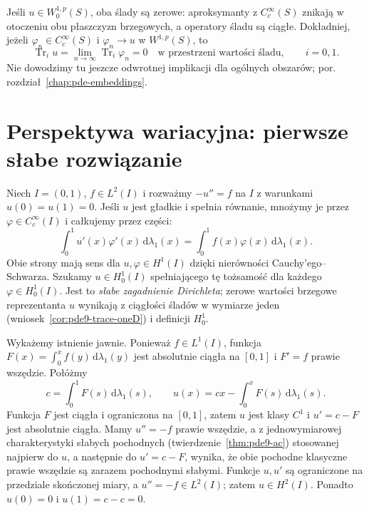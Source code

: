 Jeśli $u\in W^{1,p}_0(S)$, oba ślady są zerowe:
aproksymanty z $C_c^\infty(S)$ znikają w otoczeniu
obu płaszczyzn brzegowych, a operatory śladu są
ciągłe. Dokładniej, jeżeli $\varphi_n\in C_c^\infty(S)$
i $\varphi_n\to u$ w $W^{1,p}(S)$, to
\[
 \operatorname{Tr}_i u
 =\lim_{n\to\infty}\operatorname{Tr}_i\varphi_n=0
 \quad\text{w przestrzeni wartości śladu},\qquad i=0,1.
\]
Nie dowodzimy tu jeszcze odwrotnej implikacji
dla ogólnych obszarów; por. rozdział~\ref{chap:pde-embeddings}.

\section{Perspektywa wariacyjna: pierwsze słabe rozwiązanie}
\label{sec:pde9-weakPDE}

\begin{przyklad}
\label{ex:pde9-dirichlet}
Niech $I=(0,1)$, $f\in L^2(I)$ i rozważmy
$-u''=f$ na $I$ z warunkami $u(0)=u(1)=0$.
Jeśli $u$ jest gładkie i spełnia równanie, mnożymy je
przez $\varphi\in C_c^\infty(I)$ i całkujemy przez części:
\[
 \int_0^1u'(x)\varphi'(x)\,\mathrm d\lambda_1(x)
 =\int_0^1 f(x)\varphi(x)\,\mathrm d\lambda_1(x).
\]
Obie strony mają sens dla $u,\varphi\in H^1(I)$
dzięki nierówności Cauchy'ego--Schwarza.
Szukamy $u\in H_0^1(I)$ spełniającego tę tożsamość
dla każdego $\varphi\in H_0^1(I)$.
Jest to \emph{słabe zagadnienie Dirichleta}; zerowe
wartości brzegowe reprezentanta $u$ wynikają z
ciągłości śladów w wymiarze jeden
(wniosek~\ref{cor:pde9-trace-oneD}) i definicji $H_0^1$.

Wykażemy istnienie jawnie. Ponieważ $f\in L^1(I)$,
funkcja $F(x)=\int_0^x f(y)\,\mathrm d\lambda_1(y)$
jest absolutnie ciągła na $[0,1]$ i $F'=f$ prawie wszędzie.
Połóżmy
\[
 c=\int_0^1 F(s)\,\mathrm d\lambda_1(s),\qquad
 u(x)=cx-\int_0^x F(s)\,\mathrm d\lambda_1(s).
\]
Funkcja $F$ jest ciągła i ograniczona na $[0,1]$,
zatem $u$ jest klasy $C^1$ i $u'=c-F$ jest
absolutnie ciągła. Mamy $u''=-f$ prawie wszędzie,
a z jednowymiarowej charakterystyki słabych pochodnych
(twierdzenie~\ref{thm:pde9-ac}) stosowanej najpierw
do $u$, a następnie do $u'=c-F$, wynika, że
obie pochodne klasyczne prawie wszędzie są zarazem
pochodnymi słabymi. Funkcje $u,u'$ są ograniczone
na przedziale skończonej miary, a $u''=-f\in L^2(I)$;
zatem $u\in H^2(I)$.
Ponadto $u(0)=0$ i $u(1)=c-c=0$.


\end{przyklad}
